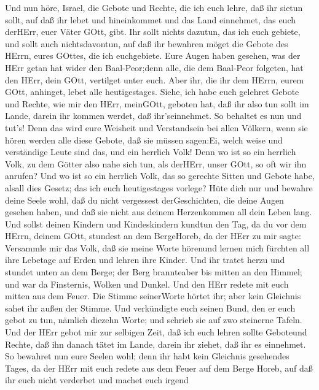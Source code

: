  Und nun höre, Israel, die Gebote und Rechte, die ich euch
lehre, daß ihr sietun sollt, auf daß ihr lebet und hineinkommet und das
Land einnehmet, das euch derHErr, euer Väter GOtt, gibt. 
Ihr sollt nichts dazutun, das ich euch gebiete, und sollt auch
nichtsdavontun, auf daß ihr bewahren möget die Gebote des HErrn, eures
GOttes, die ich euchgebiete.  Eure Augen haben gesehen, was
der HErr getan hat wider den Baal-Peor;denn alle, die dem Baal-Peor
folgeten, hat den HErr, dein GOtt, vertilget unter euch. 
Aber ihr, die ihr dem HErrn, eurem GOtt, anhinget, lebet alle
heutigestages.  Siehe, ich habe euch gelehret Gebote und
Rechte, wie mir den HErr, meinGOtt, geboten hat, daß ihr also tun sollt
im Lande, darein ihr kommen werdet, daß ihr'seinnehmet.  So
behaltet es nun und tut's! Denn das wird eure Weisheit und Verstandsein
bei allen Völkern, wenn sie hören werden alle diese Gebote, daß sie
müssen sagen:Ei, welch weise und verständige Leute sind das, und ein
herrlich Volk!  Denn wo ist so ein herrlich Volk, zu dem
Götter also nahe sich tun, als derHErr, unser GOtt, so oft wir ihn
anrufen?  Und wo ist so ein herrlich Volk, das so gerechte
Sitten und Gebote habe, alsall dies Gesetz; das ich euch heutigestages
vorlege?  Hüte dich nur und bewahre deine Seele wohl, daß du
nicht vergessest derGeschichten, die deine Augen gesehen haben, und daß
sie nicht aus deinem Herzenkommen all dein Leben lang. Und sollst deinen
Kindern und Kindeskindern kundtun  den Tag, da du vor dem
HErrn, deinem GOtt, stundest an dem BergeHoreb, da der HErr zu mir
sagte: Versammle mir das Volk, daß sie meine Worte hörenund lernen mich
fürchten all ihre Lebetage auf Erden und lehren ihre Kinder.
 Und ihr tratet herzu und stundet unten an dem Berge; der
Berg brannteaber bis mitten an den Himmel; und war da Finsternis, Wolken
und Dunkel.  Und den HErr redete mit euch mitten aus dem
Feuer. Die Stimme seinerWorte hörtet ihr; aber kein Gleichnis sahet ihr
außen der Stimme.  Und verkündigte euch seinen Bund, den er
euch gebot zu tun, nämlich diezehn Worte; und schrieb sie auf zwo
steinerne Tafeln.  Und der HErr gebot mir zur selbigen
Zeit, daß ich euch lehren sollte Geboteund Rechte, daß ihn danach tätet
im Lande, darein ihr ziehet, daß ihr es einnehmet.  So
bewahret nun eure Seelen wohl; denn ihr habt kein Gleichnis gesehendes
Tages, da der HErr mit euch redete aus dem Feuer auf dem Berge Horeb,
 auf daß ihr euch nicht verderbet und machet euch irgend
